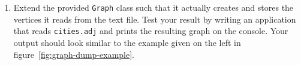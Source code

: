 \documentclass[a4paper,10pt]{article}
\begin{document}
\begin{enumerate}

\item
  Extend the provided \texttt{Graph} class such that it actually creates and stores the vertices it reads from the text file.
  Test your result by writing an application that reads \texttt{cities.adj} and prints the resulting graph on the console.
  Your output should look similar to the example given on the left in figure~\ref{fig:graph-dump-example}.
  
\end{enumerate}



\footnotesize


\end{document}
